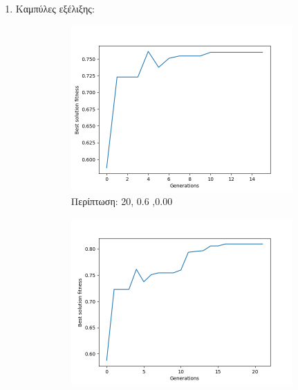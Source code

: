 \documentclass[12pt,a4paper]{article}
\begin{document}
\begin{enumerate}
            \item Καμπύλες εξέλιξης:
                \newpage
                \begin{figure}[H]
                     \centering
                     \begin{subfigure}[h]{0.7\textwidth}
                         \centering
                         \includegraphics[width=\textwidth]{images/1s.png}
                         \caption*{Περίπτωση: 20, 0.6 ,0.00}
                     \end{subfigure}
                     \hfill
                     \begin{subfigure}[h]{0.7\textwidth}
                         \centering
                         \includegraphics[width=\textwidth]{images/2s.png}

\end{subfigure}
\end{figure}
\end{enumerate}
\end{document}

